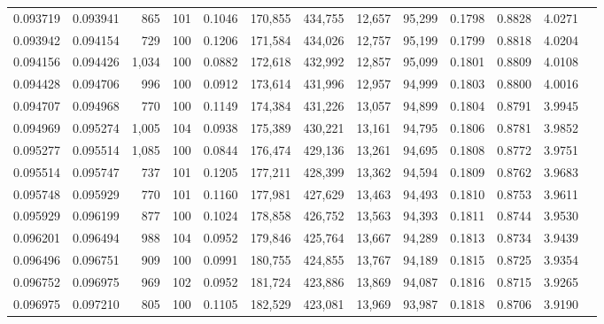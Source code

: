 \begin{tabular}{rrrrrrrrrrrrr}
0.093719 & 0.093941 &   865 & 101 &                                     0.1046 & 170,855 & 434,755 &  12,657 &  95,299 & 0.1798 & 0.8828 & 4.0271 \\
0.093942 & 0.094154 &   729 & 100 &                                     0.1206 & 171,584 & 434,026 &  12,757 &  95,199 & 0.1799 & 0.8818 & 4.0204 \\
0.094156 & 0.094426 & 1,034 & 100 &                                     0.0882 & 172,618 & 432,992 &  12,857 &  95,099 & 0.1801 & 0.8809 & 4.0108 \\
0.094428 & 0.094706 &   996 & 100 &                                     0.0912 & 173,614 & 431,996 &  12,957 &  94,999 & 0.1803 & 0.8800 & 4.0016 \\
0.094707 & 0.094968 &   770 & 100 &                                     0.1149 & 174,384 & 431,226 &  13,057 &  94,899 & 0.1804 & 0.8791 & 3.9945 \\
0.094969 & 0.095274 & 1,005 & 104 &                                     0.0938 & 175,389 & 430,221 &  13,161 &  94,795 & 0.1806 & 0.8781 & 3.9852 \\
0.095277 & 0.095514 & 1,085 & 100 &                                     0.0844 & 176,474 & 429,136 &  13,261 &  94,695 & 0.1808 & 0.8772 & 3.9751 \\
0.095514 & 0.095747 &   737 & 101 &                                     0.1205 & 177,211 & 428,399 &  13,362 &  94,594 & 0.1809 & 0.8762 & 3.9683 \\
0.095748 & 0.095929 &   770 & 101 &                                     0.1160 & 177,981 & 427,629 &  13,463 &  94,493 & 0.1810 & 0.8753 & 3.9611 \\
0.095929 & 0.096199 &   877 & 100 &                                     0.1024 & 178,858 & 426,752 &  13,563 &  94,393 & 0.1811 & 0.8744 & 3.9530 \\
0.096201 & 0.096494 &   988 & 104 &                                     0.0952 & 179,846 & 425,764 &  13,667 &  94,289 & 0.1813 & 0.8734 & 3.9439 \\
0.096496 & 0.096751 &   909 & 100 &                                     0.0991 & 180,755 & 424,855 &  13,767 &  94,189 & 0.1815 & 0.8725 & 3.9354 \\
0.096752 & 0.096975 &   969 & 102 &                                     0.0952 & 181,724 & 423,886 &  13,869 &  94,087 & 0.1816 & 0.8715 & 3.9265 \\
0.096975 & 0.097210 &   805 & 100 &                                     0.1105 & 182,529 & 423,081 &  13,969 &  93,987 & 0.1818 & 0.8706 & 3.9190 \\

\end{tabular}
